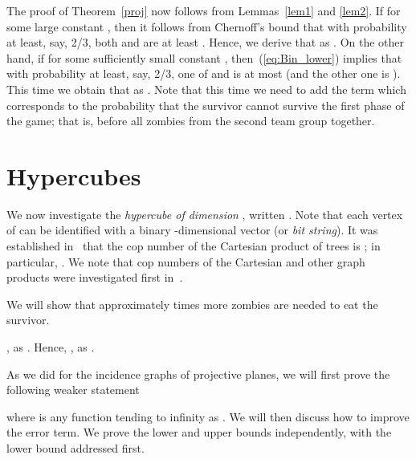 \documentclass[12pt]{amsart}
\begin{document}
The proof of Theorem~\ref{proj} now follows from Lemmas~\ref{lem1} and \ref{lem2}. If  for some large constant , then it follows from Chernoff's bound that with probability at least, say, 2/3, both  and  are at least . Hence, we derive that  as .  On the other hand, if  for some sufficiently small constant , then~(\ref{eq:Bin_lower}) implies that with probability at least, say, 2/3, one of  and  is at most  (and the other one is ).  This time we obtain that
 as . Note that this time we need to add the  term which corresponds to the probability that the survivor cannot survive the first phase of the game; that is, before all zombies from the second team group together.

\section{Hypercubes}\label{sechyper}

We now investigate the \emph{hypercube of dimension} , written . Note that each vertex of  can be identified with a binary -dimensional vector (or \emph{bit string}). It was established in~\cite{mm} that the cop
number of the Cartesian product of  trees is ; in particular, . We note that cop numbers of the Cartesian and other graph products were investigated first in~\cite{nn}. 

We will show that approximately  times more zombies are needed to eat the survivor.


\begin{theorem}\label{hyper}
, as . Hence, , as .
\end{theorem}

\noindent
As we did for the incidence graphs of projective planes, we will first prove the following weaker statement

where  is any function tending to infinity as . We will then discuss how to improve the error term.  We prove the lower and upper bounds independently, with the lower bound addressed first.
\end{document}
